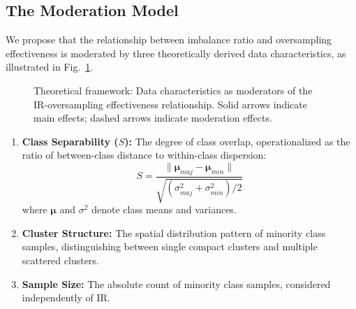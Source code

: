 \documentclass{ijSmartGrid}
\theoremstyle{definition}
\begin{document}
\subsection{The Moderation Model}
\indent We propose that the relationship between imbalance ratio and oversampling effectiveness is moderated by three theoretically derived data characteristics, as illustrated in Fig.~\ref{fig:framework}.

\begin{figure}[!ht]
  \centering
  \caption{Theoretical framework: Data characteristics as moderators of the IR-oversampling effectiveness relationship. Solid arrows indicate main effects; dashed arrows indicate moderation effects.}
  \label{fig:framework}
\end{figure}

\begin{enumerate}
    \item \textbf{Class Separability ($S$):} The degree of class overlap, operationalized as the ratio of between-class distance to within-class dispersion:
    \begin{equation}
    S = \frac{\|\boldsymbol{\mu}_{maj} - \boldsymbol{\mu}_{min}\|}{\sqrt{(\sigma^2_{maj} + \sigma^2_{min})/2}}
    \label{eq:separability}
    \end{equation}
    where $\boldsymbol{\mu}$ and $\sigma^2$ denote class means and variances.
    
    \item \textbf{Cluster Structure:} The spatial distribution pattern of minority class samples, distinguishing between single compact clusters and multiple scattered clusters.
    
    \item \textbf{Sample Size:} The absolute count of minority class samples, considered independently of IR.
\end{enumerate}
\end{document}
